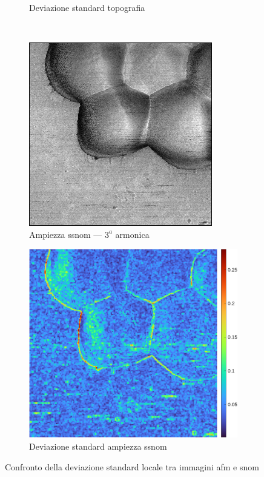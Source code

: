 \documentclass[../main.tex]{subfiles}
\begin{document}
\begin{figure}[ht]
\begin{subfigure}{0.4425\linewidth}
		\caption{Deviazione standard topografia}
	\end{subfigure}\\[4pt]
	\begin{subfigure}{0.4\linewidth}
		\includegraphics[keepaspectratio, width=\linewidth]{images/sa_zoom_o3a.png}
		\caption{Ampiezza \acrshort{ssnom} --- $3^a$ armonica}
	\end{subfigure}\hspace{12pt}
	\begin{subfigure}{0.4425\linewidth}
		\includegraphics[keepaspectratio, width=\linewidth]{images/local_std_o3a.png}
		\caption{Deviazione standard ampiezza \acrshort{ssnom}}
	\end{subfigure}
	\caption[Confronto della deviazione standard locale tra immagini AFM e SNOM]{
		Confronto della deviazione standard locale tra immagini \acrshort{afm} e \acrshort{snom}}
\end{figure}
\end{document}
